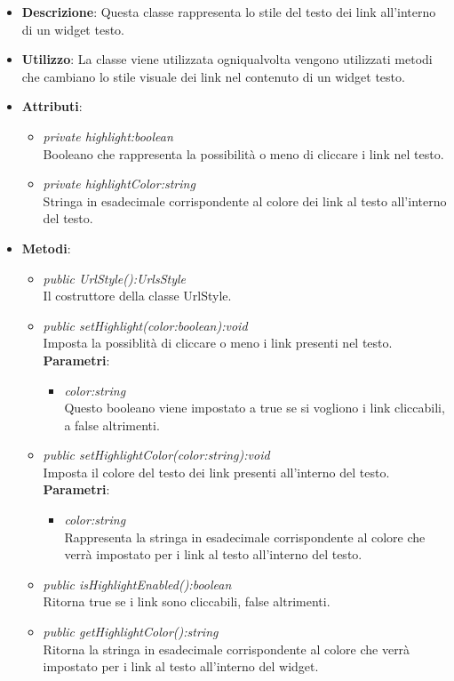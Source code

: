 \begin{itemize}
\item \textbf{Descrizione}: Questa classe rappresenta lo stile del testo dei link all'interno di un widget testo.
\item \textbf{Utilizzo}: La classe viene utilizzata ogniqualvolta vengono utilizzati metodi che cambiano lo stile visuale dei link nel contenuto di un widget testo.
\item \textbf{Attributi}:
	\begin{itemize}
	\item \textit{private highlight:boolean}\\
	Booleano che rappresenta la possibilità o meno di cliccare i link nel testo.
	\item \textit{private highlightColor:string}\\
	Stringa in esadecimale corrispondente al colore dei link al testo all'interno del testo.
	\end{itemize}
\item \textbf{Metodi}:
	\begin{itemize}
	\item \textit{public UrlStyle():UrlsStyle}\\
	Il costruttore della classe UrlStyle.
	\item \textit{public setHighlight(color:boolean):void}\\
	Imposta la possiblità di cliccare o meno i link presenti nel testo.
		\\ \textbf{Parametri}: \begin{itemize}
		\item \textit{color:string}\\
		Questo booleano viene impostato a true se si vogliono i link cliccabili, a false altrimenti.
		\end{itemize} 
	\item \textit{public setHighlightColor(color:string):void}\\
	Imposta il colore del testo dei link presenti all'interno del testo.
		\\ \textbf{Parametri}: \begin{itemize}
		\item \textit{color:string}\\
		Rappresenta la stringa in esadecimale corrispondente al colore che verrà impostato per i link al testo all'interno del testo.
		\end{itemize} 
	\item \textit{public isHighlightEnabled():boolean}\\
	Ritorna true se i link sono cliccabili, false altrimenti.
	\item \textit{public getHighlightColor():string}\\
	Ritorna la stringa in esadecimale corrispondente al colore che verrà impostato per i link al testo all'interno del widget.
	\end{itemize}
\end{itemize}

